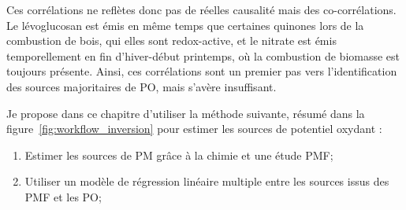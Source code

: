 Ces corrélations ne reflètes donc pas de réelles causalité mais des co-corrélations. Le
lévoglucosan est émis en même temps que certaines quinones lors de la combustion de bois,
qui elles sont redox-active, et le nitrate est émis temporellement en fin d'hiver-début
printemps, où la combustion de biomasse est toujours présente. 
Ainsi, ces corrélations sont un premier pas vers l'identification des sources majoritaires
de PO, mais s'avère insuffisant.

Je propose dans ce chapitre d'utiliser la méthode suivante, résumé dans la
figure~\ref{fig:workflow_inversion} pour estimer les sources de potentiel oxydant :
\begin{enumerate}
    \item Estimer les sources de PM grâce à la chimie et une étude PMF;
    \item Utiliser un modèle de régression linéaire multiple entre les sources issus
        des PMF et les PO;
\end{enumerate}

